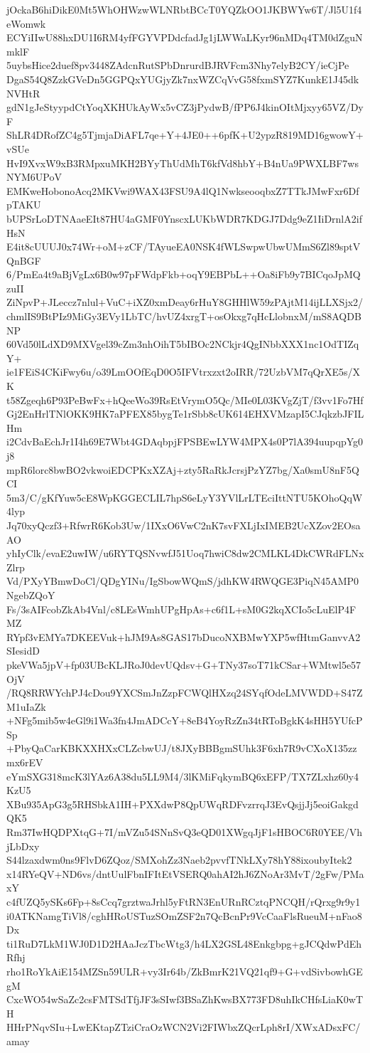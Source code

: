 jOckaB6hiDikE0Mt5WhOHWzwWLNRbtBCcT0YQZkOO1JKBWYw6T/Jl5U1f4eWomwk
ECYiIIwU88hxDU1I6RM4yfFGYVPDdcfadJg1jLWWaLKyr96nMDq4TM0dZguNmklF
5uybsHice2duef8pv3448ZAdcnRutSPbDnrurdBJRVFcm3Nhy7elyB2CY/ieCjPe
DgaS54Q8ZzkGVeDn5GGPQxYUGjyZk7nxWZCqVvG58fxmSYZ7KunkE1J45dkNVHtR
gdN1gJeStyypdCtYoqXKHUkAyWx5vCZ3jPydwB/fPP6J4kinOItMjxyy65VZ/DyF
ShLR4DRofZC4g5TjmjaDiAFL7qe+Y+4JE0++6pfK+U2ypzR819MD16gwowY+vSUe
HvI9XvxW9xB3RMpxuMKH2BYyThUdMhT6kfVd8hbY+B4nUa9PWXLBF7wsNYM6UPoV
EMKweHobonoAcq2MKVwi9WAX43FSU9A4lQ1NwkseooqbxZ7TTkJMwFxr6DfpTAKU
bUPSrLoDTNAaeEIt87HU4aGMF0YnscxLUKbWDR7KDGJ7Ddg9eZ1IiDrnlA2ifHsN
E4it8cUUUJ0x74Wr+oM+zCF/TAyueEA0NSK4fWLSwpwUbwUMmS6Zl89sptVQnBGF
6/PmEa4t9aBjVgLx6B0w97pFWdpFkb+oqY9EBPbL++Oa8iFb9y7BICqoJpMQzuII
ZiNpvP+JLeccz7nlul+VuC+iXZ0xmDeay6rHuY8GHHlW59zPAjtM14ijLLXSjx2/
chmlIS9BtPIz9MiGy3EVy1LbTC/hvUZ4xrgT+osOkxg7qHcLlobnxM/mS8AQDBNP
60Vd50lLdXD9MXVgel39cZm3nhOihT5bIBOc2NCkjr4QgINbbXXX1nc1OdTIZqY+
ie1FEiS4CKiFwy6u/o39LmOOfEqD0O5IFVtrxzxt2oIRR/72UzbVM7qQrXE5s/XK
t58Zgeqh6P93PeBwFx+hQeeWo39RsEtVrymO5Qc/MIe0L03KVgZjT/f3vv1Fo7Hf
Gj2EnHrlTNlOKK9HK7aPFEX85bygTe1rSbb8cUK614EHXVMzapI5CJqkzbJFILHm
i2CdvBaEchJr1I4h69E7Wbt4GDAqbpjFPSBEwLYW4MPX4s0P7lA394uupqpYg0j8
mpR6lorc8bwBO2vkwoiEDCPKxXZAj+zty5RaRkJcrsjPzYZ7bg/Xa0smU8nF5QCI
5m3/C/gKfYuw5cE8WpKGGECLIL7hpS6eLyY3YVlLrLTEciIttNTU5KOhoQqW4lyp
Jq70xyQczf3+RfwrR6Kob3Uw/1IXxO6VwC2nK7svFXLjIxIMEB2UcXZov2EOsaAO
yhIyClk/evaE2uwIW/u6RYTQSNvwfJ51Uoq7hwiC8dw2CMLKL4DkCWRdFLNxZlrp
Vd/PXyYBmwDoCl/QDgYINu/IgSbowWQmS/jdhKW4RWQGE3PiqN45AMP0NgebZQoY
Fs/3sAIFcobZkAb4Vnl/c8LEsWmhUPgHpAs+c6f1L+sM0G2kqXCIo5cLuElP4FMZ
RYpf3vEMYa7DKEEVuk+hJM9As8GAS17bDucoNXBMwYXP5wfHtmGanvvA2SIesidD
pkeVWa5jpV+fp03UBcKLJRoJ0devUQdsv+G+TNy37soT71kCSar+WMtwl5e57OjV
/RQ8RRWYchPJ4cDou9YXCSmJnZzpFCWQlHXzq24SYqfOdeLMVWDD+S47ZM1uIaZk
+NFg5mib5w4eGl9i1Wa3fn4JmADCcY+8eB4YoyRzZn34tRToBgkK4sHH5YUfcPSp
+PbyQaCarKBKXXHXxCLZcbwUJ/t8JXyBBBgmSUhk3F6xh7R9vCXoX135zzmx6rEV
eYmSXG318mcK3lYAz6A38du5LL9M4/3lKMiFqkymBQ6xEFP/TX7ZLxhz60y4KzU5
XBu935ApG3g5RHSbkA1IH+PXXdwP8QpUWqRDFvzrrqJ3EvQsjjJj5eoiGakgdQK5
Rm37IwHQDPXtqG+7I/mVZu54SNnSvQ3eQD01XWgqJjF1sHBOC6R0YEE/VhjLbDxy
S44lzaxdwm0ns9FlvD6ZQoz/SMXohZz3Naeb2pvvfTNkLXy78hY88ixoubyItek2
x14RYeQV+ND6vs/dntUulFbnIFItEtVSERQ0ahAI2hJ6ZNoAr3MvT/2gFw/PMaxY
c4fUZQ5ySKs6Fp+8sCcq7grztwaJrhl5yFtRN3EnURnRCztqPNCQH/rQrxg9r9y1
i0ATKNamgTiVl8/cghHRoUSTuzSOmZSF2n7QcBcnPr9VcCaaFlsRueuM+nFao8Dx
ti1RuD7LkM1WJ0D1D2HAaJczTbcWtg3/h4LX2GSL48Enkgbpg+gJCQdwPdEhRfhj
rho1RoYkAiE154MZSn59ULR+vy3Ir64b/ZkBmrK21VQ21qf9+G+vdSivbowhGEgM
CxcWO54wSaZc2csFMTSdTfjJF3sSIwf3BSaZhKwsBX773FD8uhIkCHfsLiaK0wTH
HHrPNqvSIu+LwEKtapZTziCraOzWCN2Vi2FIWbxZQcrLph8rI/XWxADsxFC/amay
